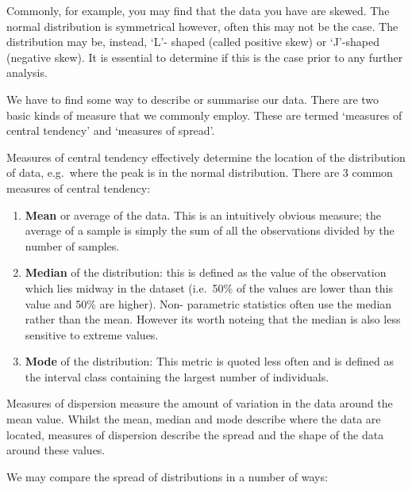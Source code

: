 \documentclass[
]{book}
\begin{document}
Commonly, for example, you may find that the data you have are skewed. The normal distribution is symmetrical however, often this may not be the case. The distribution may be, instead, `L'- shaped (called positive skew) or `J'-shaped (negative skew). It is essential to determine if this is the case prior to any further analysis.

We have to find some way to describe or summarise our data. There are two basic kinds of measure that we commonly employ. These are termed `measures of central tendency' and `measures of spread'.

Measures of central tendency effectively determine the location of the distribution of data, e.g.~where the peak is in the normal distribution. There are 3 common measures of central tendency:

\begin{enumerate}
\def\labelenumi{\arabic{enumi})}
\item
  \textbf{Mean} or average of the data. This is an intuitively obvious measure; the average of a sample is simply the sum of all the observations divided by the number of samples.
\item
  \textbf{Median} of the distribution: this is defined as the value of the observation which lies midway in the dataset (i.e.~50\% of the values are lower than this value and 50\% are higher). Non- parametric statistics often use the median rather than the mean. However its worth noteing that the median is also less sensitive to extreme values.
\item
  \textbf{Mode} of the distribution: This metric is quoted less often and is defined as the interval class containing the largest number of individuals.
\end{enumerate}

Measures of dispersion measure the amount of variation in the data around the mean value. Whilst the mean, median and mode describe where the data are located, measures of dispersion describe the spread and the shape of the data around these values.

We may compare the spread of distributions in a number of ways:
\end{document}
